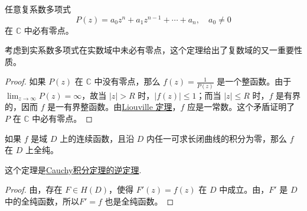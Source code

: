 \documentclass[../../main.tex]{subfiles}
\begin{document}
\begin{theorem}[代数学基本定理]\label{theorem:代数学基本定理}
任意复系数多项式
\[
P(z) = a_0 z^n + a_1 z^{n - 1} + \cdots + a_n, \quad a_0 \neq 0
\]
在 \( \mathbb{C} \) 中必有零点。
\end{theorem}
\begin{note}
考虑到实系数多项式在实数域中未必有零点，这个定理给出了复数域的又一重要性质。
\end{note}
\begin{proof}
如果 \( P(z) \) 在 \( \mathbb{C} \) 中没有零点，那么 \( f(z) = \frac{1}{P(z)} \) 是一个整函数。由于 \( \lim_{z \to \infty} P(z) = \infty \)，故当 \( |z| > R \) 时，\( |f(z)| \leqslant 1 \)；而当 \( |z| \leqslant R \) 时，\( f \) 是有界的，因而 \( f \) 是一有界整函数。由\hyperref[theorem:Liouville(刘维尔)定理]{Liouville 定理}，\( f \) 应是一常数。这个矛盾证明了 \( P \) 在 \( \mathbb{C} \) 中必有零点。

\end{proof}

\begin{theorem}[Morera定理]\label{theorem:Morera(莫雷拉)定理}
如果 \( f \) 是域 \( D \) 上的连续函数，且沿 \( D \) 内任一可求长闭曲线的积分为零，那么 \( f \) 在 \( D \) 上全纯。
\end{theorem}
\begin{note}
这个定理是\hyperref[theorem:Cauchy-Goursat定理(Cauchy积分定理)]{Cauchy积分定理的逆定理}.
\end{note}
\begin{proof}
由，存在 \( F \in H(D) \)，使得 \( F'(z) = f(z) \) 在 \( D \) 中成立。由，\( F' \) 是 \( D \) 中的全纯函数，所以\(F' = f \) 也是全纯函数。

\end{proof}
\end{document}
